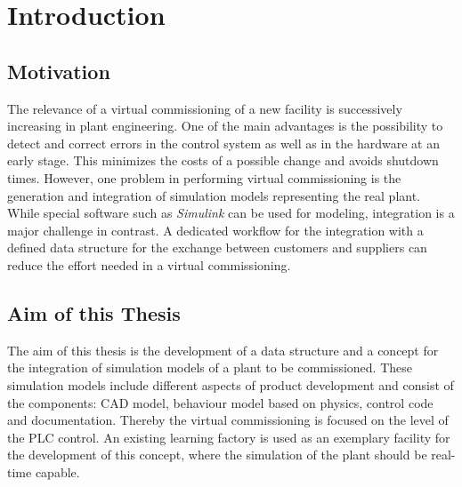 \chapter{Introduction}
\section{Motivation}
    The relevance of a virtual commissioning of a new facility is successively increasing in plant engineering. One of the main advantages is the possibility to detect and correct errors in the control system as well as in the hardware at an early stage. This minimizes the costs of a possible change and avoids shutdown times. However, one problem in performing virtual commissioning is the generation and integration of simulation models representing the real plant. While special software such as \textit{Simulink} can be used for modeling, integration is a major challenge in contrast. A dedicated workflow for the integration with a defined data structure for the exchange between customers and suppliers can reduce the effort needed in a virtual commissioning.

\section{Aim of this Thesis}
    The aim of this thesis is the development of a data structure and a concept for the integration of simulation models of a plant to be commissioned. These simulation models include different aspects of product development and consist of the components: CAD model, behaviour model based on physics, control code and documentation. Thereby the virtual commissioning is focused on the level of the PLC control. An existing learning factory is used as an exemplary facility for the development of this concept, where the simulation of the plant should be real-time capable. 

